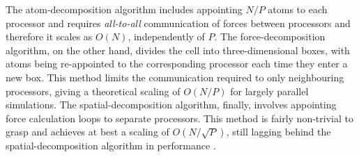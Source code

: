 The atom-decomposition algorithm includes appointing $N/P$ atoms to each processor and requires \textit{all-to-all} communication of forces between processors and therefore it scales as $O(N)$, independently of $P$. 
The force-decomposition algorithm, on the other hand, divides the cell into three-dimensional boxes, with atoms being re-appointed to the corresponding processor each time they enter a new box. 
This method limits the communication required to only neighbouring processors, giving a theoretical scaling of $O(N/P)$ for largely parallel simulations.
The spatial-decomposition algorithm, finally, involves appointing force calculation loops to separate processors.
This method is fairly non-trivial to grasp and achieves at best a scaling of $O(N/\sqrt{P})$, still lagging behind the spatial-decomposition algorithm in performance \cite{fincham1987parallel,lammpsMD}.


